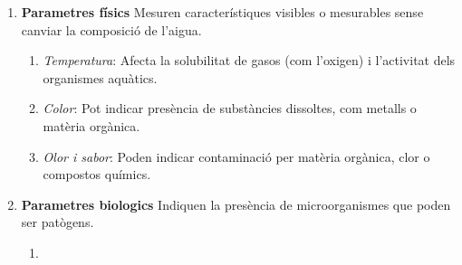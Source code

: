 \begin{enumerate}[1)]
 \item \textbf{Parametres físics}
 Mesuren característiques visibles o mesurables sense canviar la composició de l’aigua.
 \begin{enumerate}
  \item \textit{Temperatura}: Afecta la solubilitat de gasos (com l’oxigen) i l’activitat dels organismes aquàtics.
  \item \textit{Color}: Pot indicar presència de substàncies dissoltes, com metalls o matèria orgànica.
  \item \textit{Olor i sabor}: Poden indicar contaminació per matèria orgànica, clor o compostos químics.
 \end{enumerate}



 \item \textbf{Parametres biologics}
 Indiquen la presència de microorganismes que poden ser patògens.
 \begin{enumerate}
  \item
 \end{enumerate}

\end{enumerate}




